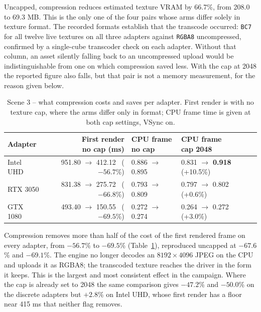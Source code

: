 Uncapped, compression reduces estimated texture VRAM by 66.7\%, from 208.0 to 69.3 MB. This is the only one of the four pairs whose arms differ solely in texture format. The recorded formats establish that the transcode occurred: \texttt{BC7} for all twelve live textures on all three adapters against \texttt{RGBA8} uncompressed, confirmed by a single-cube transcoder check on each adapter. Without that column, an asset silently falling back to an uncompressed upload would be indistinguishable from one on which compression saved less. With the cap at 2048 the reported figure also falls, but that pair is not a memory measurement, for the reason given below.

\begin{table}[H]
\centering\small\setlength{\tabcolsep}{3pt}
\caption{Scene 3 -- what compression costs and saves per adapter. First render is with no texture cap, where the arms differ only in format; CPU frame time is given at both cap settings, VSync on.}
\label{tab:ktx2-effects}
\begin{tabular}{lrll}
\toprule
Adapter & \makecell[r]{First render\\no cap (ms)} & \makecell[l]{CPU frame\\no cap} & \makecell[l]{CPU frame\\cap 2048} \\
\midrule
Intel UHD & 951.80 $\rightarrow$ 412.12 \ ($-56.7$\%) & 0.886 $\rightarrow$ 0.895 & 0.831 $\rightarrow$ \textbf{0.918} (+10.5\%) \\
RTX 3050  & 831.38 $\rightarrow$ 275.72 \ ($-66.8$\%) & 0.793 $\rightarrow$ 0.809 & 0.797 $\rightarrow$ 0.802 (+0.6\%) \\
GTX 1080  & 493.40 $\rightarrow$ 150.55 \ ($\mathbf{-69.5}$\%) & 0.272 $\rightarrow$ 0.274 & 0.264 $\rightarrow$ 0.272 (+3.0\%) \\
\bottomrule
\end{tabular}
\end{table}

Compression removes more than half of the cost of the first rendered frame on every adapter, from $-56.7$\% to $-69.5$\% (Table~\ref{tab:ktx2-effects}), reproduced uncapped at $-67.6$\% and $-69.1$\%. The engine no longer decodes an $8192\times4096$ JPEG on the CPU and uploads it as RGBA8; the transcoded texture reaches the driver in the form it keeps. This is the largest and most consistent effect in the campaign. Where the cap is already set to 2048 the same comparison gives $-47.2$\% and $-50.0$\% on the discrete adapters but $+2.8$\% on Intel UHD, whose first render has a floor near 415 ms that neither flag removes.


